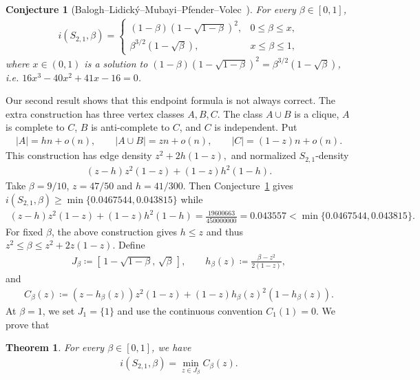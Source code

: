\documentclass[10pt,a4paper]{article}
\newtheorem{theorem}[definition]{Theorem}
\newtheorem{conjecture}[definition]{Conjecture}
\begin{document}
\begin{conjecture}[Balogh--Lidick\'y--Mubayi--Pfender--Volec~\cite{BLMPV}]\label{conj:lower-profile}
For every $\beta\in[0,1]$,
\begin{align*}
        i(S_{2,1},\beta)=
        \begin{cases}
        (1-\beta)(1-\sqrt{1-\beta})^2, & 0\le \beta\le x,\\[1mm]
        \beta^{3/2}(1-\sqrt{\beta}), & x\le \beta\le 1,
        \end{cases}
\end{align*}
where $x\in(0,1)$ is a solution to $(1-\beta)(1-\sqrt{1-\beta})^2= \beta^{3/2}(1-\sqrt{\beta})$, i.e. $16x^3-40x^2+41x-16=0$.
\end{conjecture}
Our second result shows that this endpoint formula is not always correct.
The extra construction has three vertex classes $A,B,C$.  The class
$A\cup B$ is a clique, $A$ is complete to $C$, $B$ is
anti-complete to $C$, and $C$ is independent.  Put
\begin{align*}
        |A|=hn+o(n),\qquad |A\cup B|=zn+o(n),\qquad
        |C|=(1-z)n+o(n).
\end{align*}
This construction has edge density
$
        z^2+2h(1-z),
$
and normalized $S_{2,1}$-density
\begin{align*}
        (z-h)z^2(1-z)+(1-z)h^2(1-h).
\end{align*}
Take $\beta=9/10$, $z=47/50$ and $h=41/300$. Then Conjecture~\ref{conj:lower-profile} gives $i(S_{2,1},\beta)\ge\min\{0.0467544,0.043815\}$ while 
\begin{align*}
     (z-h)z^2(1-z)+(1-z)h^2(1-h)=\frac{19600663}{450000000}=0.043557<\min\{0.0467544,0.043815\}.
\end{align*}
For fixed $\beta$, the above construction gives $h\le z$ and thus $z^2\le \beta\le z^2+2z(1-z)$. Define
\begin{align}\label{eq:Jbeta-hbeta}
      J_\beta\coloneqq[\,1-\sqrt{1-\beta},\,\sqrt{\beta}\,],
        \qquad
        h_\beta(z)\coloneqq\frac{\beta-z^2}{2(1-z)},
\end{align}
and
\begin{align}\label{eq:Cbeta}
     C_\beta(z)\coloneqq
        (z-h_\beta(z))z^2(1-z)
        +(1-z)h_\beta(z)^2(1-h_\beta(z)).
\end{align}
At $\beta=1$, we set $J_1=\{1\}$ and use the continuous convention
$C_1(1)=0$. We prove that 

\begin{theorem}\label{thm:lower}
For every $\beta\in[0,1]$, we have 
\begin{align*}
  i(S_{2,1},\beta)=\min_{z\in J_\beta} C_\beta(z).
\end{align*}
\end{theorem}
\end{document}
